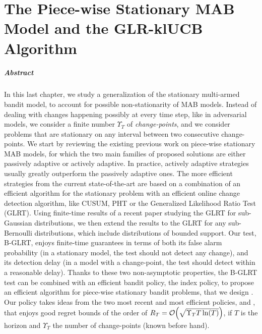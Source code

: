 

\chapter{The Piece-wise Stationary MAB Model and the GLR-klUCB Algorithm}
\label{chapter:6}
\minitoc

\paragraph{Abstract}

In this last chapter, we study a generalization of the stationary multi-armed bandit model,
to account for possible non-stationarity of MAB models.
Instead of dealing with changes happening possibly at every time step, like in adversarial models, we consider a finite number $\Upsilon_T$ of \emph{change-points}, and we consider problems that are stationary on any interval between two consecutive change-points.
%
We start by reviewing the existing previous work on piece-wise stationary MAB models, for which the two main families of proposed solutions are either passively adaptive or actively adaptive. In practice, actively adaptive strategies usually greatly outperform the passively adaptive ones.
The more efficient strategies from the current state-of-the-art are based on a combination of an efficient algorithm for the stationary problem with an efficient online change detection algorithm, like CUSUM, PHT or the Generalized Likelihood Ratio Test (GLRT).
Using finite-time results of a recent paper studying the GLRT for sub-Gaussian distributions, we then extend the results to the GLRT for any sub-Bernoulli distributions, which include distributions of bounded support. Our test, B-GLRT, enjoys finite-time guarantees in terms of both its false alarm probability (in a stationary model, the test should not detect any change), and its detection delay (in a model with a change-point, the test should detect within a reasonable delay).
%
Thanks to these two non-asymptotic properties, the B-GLRT test can be combined with an efficient bandit policy, the \klUCB{} index policy, to propose an efficient algorithm for piece-wise stationary bandit problems, that we design \GLRklUCB.
Our policy takes ideas from the two most recent and most efficient policies, \CUSUMUCB{} and \MUCB, that enjoys good regret bounds of the order of $R_T = \mathop{}\mathopen{}\mathcal{O}\mathopen{}\left(\sqrt{\Upsilon_T T \ln(T)}\right)$, if $T$ is the horizon and $\Upsilon_T$ the number of change-points (known before hand).
